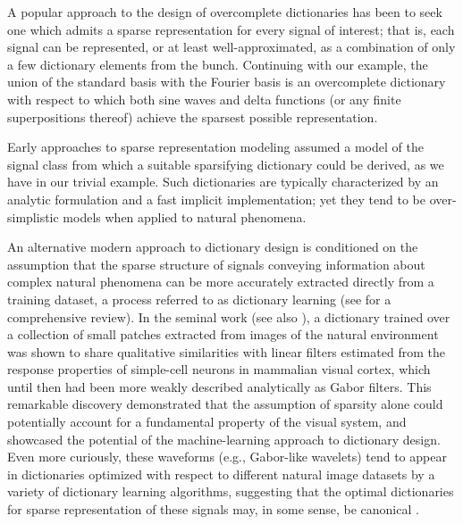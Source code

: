 A popular approach to the design of overcomplete dictionaries has been to seek one which admits a sparse representation for every signal of interest; that is, each signal can be represented, or at least well-approximated, as a combination of only a few dictionary elements from the bunch. Continuing with our example, the union of the standard basis with the Fourier basis is an overcomplete dictionary with respect to which both sine waves and delta functions (or any finite superpositions thereof) achieve the sparsest possible representation.

Early approaches to sparse representation modeling assumed a model of the signal class from which a suitable sparsifying dictionary could be derived, as we have in our trivial example. Such dictionaries are typically characterized by an analytic formulation and a fast implicit implementation; yet they tend to be over-simplistic models when applied to natural phenomena. 

An alternative modern approach to dictionary design is conditioned on the assumption that the sparse structure of signals conveying information about complex natural phenomena can be more accurately extracted directly from a training dataset, a process referred to as dictionary learning  (see \cite{Zhang15} for a comprehensive review). In the seminal work \cite{Olshausen96} (see also \cite{hurri1996image, bell1997independent, van1998independent}), a dictionary trained over a collection of small patches extracted from images of the natural environment was shown to share qualitative similarities with linear filters estimated from the response properties of simple-cell neurons in mammalian visual cortex, which until then had been more weakly described analytically as Gabor filters. This remarkable discovery demonstrated that the assumption of sparsity alone could potentially account for a fundamental property of the visual system, and showcased the potential of the machine-learning approach to dictionary design. Even more curiously, these waveforms (e.g., Gabor-like wavelets) tend to appear in dictionaries optimized with respect to different natural image datasets by a variety of dictionary learning algorithms, suggesting that the optimal dictionaries for sparse representation of these signals may, in some sense, be canonical \cite{donoho2001can}.


